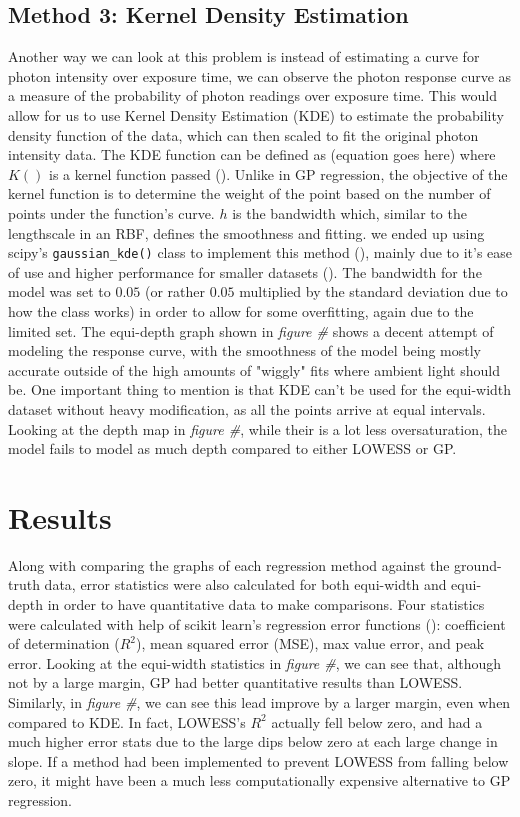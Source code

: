 \documentclass[letterpaper,12pt]{article}
\begin{document}
\subsection{Method 3: Kernel Density Estimation}
Another way we can look at this problem is instead of estimating a curve for photon intensity
over exposure time, we can observe the photon response curve as a measure of the probability of 
photon readings over exposure time. This would allow for us to use Kernel Density Estimation (KDE)
to estimate the probability density function of the data, which can then scaled to fit the 
original photon intensity data. The KDE function can be defined as (equation goes here) where
$K()$ is a kernel function passed (\cite{chen2018lecture}). Unlike in GP regression, the 
objective of the kernel function is to determine the weight of the point based on the number 
of points under the function's curve. $h$ is the bandwidth which, similar to the lengthscale 
in an RBF, defines the smoothness and fitting. we ended up using scipy's \verb|gaussian_kde()| 
class to implement this method (\cite{virtanen2020scipy}), mainly due to it's ease of use 
and higher performance for smaller datasets (\cite{VanderPlas_2023}). The bandwidth for the
model was set to $0.05$ (or rather $0.05$ multiplied by the standard deviation due to how
the class works) in order to allow for some overfitting, again due to the limited set.
The equi-depth graph shown in \emph{figure \#} shows a decent attempt of modeling the response
curve, with the smoothness of the model being mostly accurate outside of the high amounts
of "wiggly" fits where ambient light should be. One important thing to mention is that 
KDE can't be used for the equi-width dataset without heavy modification, as all the points
arrive at equal intervals. Looking at the depth map in \emph{figure \#}, while their is a lot
less oversaturation, the model fails to model as much depth compared to either LOWESS or GP.

\section{Results}
Along with comparing the graphs of each regression method against the ground-truth data,
error statistics were also calculated for both equi-width and equi-depth in order to 
have quantitative data to make comparisons. Four statistics were calculated with help of
scikit learn's regression error functions (\cite{scikit-learn}): coefficient of determination
($R^2$), mean squared error (MSE), max value error, and peak error. Looking at the equi-width
statistics in \emph{figure \#}, we can see that, although not by a large margin, GP had
better quantitative results than LOWESS. Similarly, in \emph{figure \#}, we can see this lead
improve by a larger margin, even when compared to KDE. In fact, LOWESS's $R^2$ actually fell
below zero, and had a much higher error stats due to the large dips below zero at each
large change in slope. If a method had been implemented to prevent LOWESS from falling below
zero, it might have been a much less computationally expensive alternative to GP regression.
\end{document}
